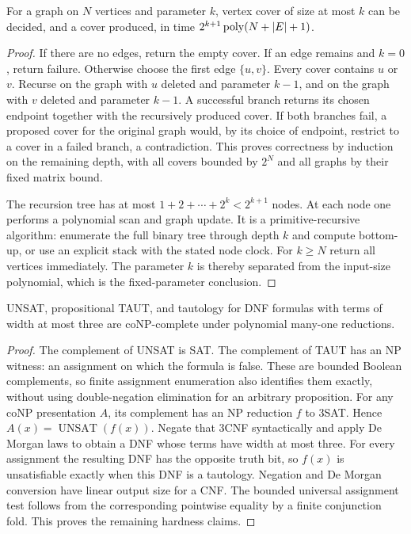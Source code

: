 \begin{theorem}\label{thm:N20}
For a graph on $N$ vertices and parameter $k$, vertex cover of size at most
$k$ can be decided, and a cover produced, in time
$2^{k+1}\operatorname{poly}(N+|E|+1)$.
\end{theorem}
\begin{proof}
If there are no edges, return the empty cover. If an edge remains and $k=0$,
return failure. Otherwise choose the first edge $\{u,v\}$. Every cover
contains $u$ or $v$. Recurse on the graph with $u$ deleted and parameter
$k-1$, and on the graph with $v$ deleted and parameter $k-1$. A successful
branch returns its chosen endpoint together with the recursively produced
cover. If both branches fail, a proposed cover for the original graph would,
by its choice of endpoint, restrict to a cover in a failed branch, a
contradiction. This proves correctness by induction on the remaining depth,
with all covers bounded by $2^N$ and all graphs by their fixed matrix bound.

The recursion tree has at most $1+2+\cdots+2^k<2^{k+1}$ nodes. At each node
one performs a polynomial scan and graph update. It is a primitive-recursive
algorithm: enumerate the full binary tree through depth $k$ and compute
bottom-up, or use an explicit stack with the stated node clock. For $k\ge N$
return all vertices immediately. The parameter $k$ is thereby separated from
the input-size polynomial, which is the fixed-parameter conclusion.
\end{proof}

\begin{theorem}\label{thm:N21}
UNSAT, propositional TAUT, and tautology for DNF formulas with terms of width
at most three are coNP-complete under polynomial many-one reductions.
\end{theorem}
\begin{proof}
The complement of UNSAT is SAT. The complement of TAUT has an NP witness: an
assignment on which the formula is false. These are bounded Boolean
complements, so finite assignment enumeration also identifies them exactly,
without using double-negation elimination for an arbitrary proposition.
For any coNP presentation $A$, its complement has an NP reduction $f$ to 3SAT.
Hence $A(x)=\operatorname{UNSAT}(f(x))$. Negate that 3CNF syntactically and
apply De Morgan laws to obtain a DNF whose terms have width at most three.
For every assignment the resulting DNF has the opposite truth bit, so
$f(x)$ is unsatisfiable exactly when this DNF is a tautology. Negation and
De Morgan conversion have linear output size for a CNF. The bounded universal
assignment test follows from the corresponding pointwise equality by a
finite conjunction fold. This proves the remaining hardness claims.
\end{proof}

